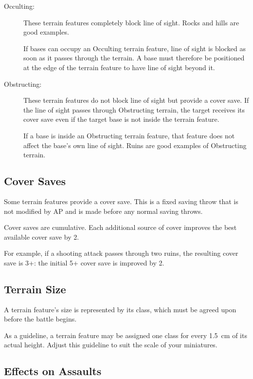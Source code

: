 \begin{description}
    \item[Occulting:] These terrain features completely block line of sight. Rocks and hills are good examples.

    If bases can occupy an Occulting terrain feature, line of sight is blocked as soon as it passes through the terrain. A base must therefore be positioned at the edge of the terrain feature to have line of sight beyond it.

    \item[Obstructing:] These terrain features do not block line of sight but provide a cover save. If the line of sight passes through Obstructing terrain, the target receives its cover save even if the target base is not inside the terrain feature.

    If a base is inside an Obstructing terrain feature, that feature does not affect the base's own line of sight. Ruins are good examples of Obstructing terrain.
\end{description}

\subsection{Cover Saves}

Some terrain features provide a cover save. This is a fixed saving throw that is not modified by AP and is made before any normal saving throws.

Cover saves are cumulative. Each additional source of cover improves the best available cover save by 2.

For example, if a shooting attack passes through two ruins, the resulting cover save is 3+: the initial 5+ cover save is improved by 2.

\subsection{Terrain Size}
A terrain feature's size is represented by its class, which must be agreed upon before the battle begins.

As a guideline, a terrain feature may be assigned one class for every 1.5~cm of its actual height. Adjust this guideline to suit the scale of your miniatures.

\subsection{Effects on Assaults}


